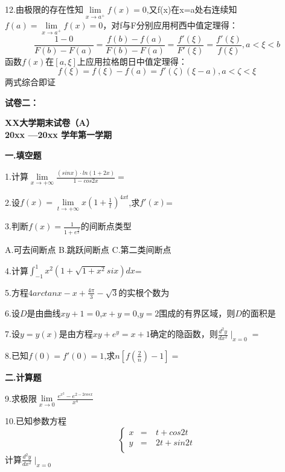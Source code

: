 \documentclass{ctexart}
\begin{document}
12.由极限的存在性知$\lim\limits_{x\rightarrow a^{+}}f(x)=0$,又f(x)在x=a处右连续知$f(a)=\lim\limits_{x\rightarrow a^{+}}f(x)=0$，对f与F分别应用柯西中值定理得：
$$\frac{1-0}{F(b)-F(a)}=\frac{f(b)-f(a)}{F(b)-F(a)}=\frac{f'(\xi)}{F'(\xi)}=\frac{f'(\xi)}{f(\xi)},a<\xi<b$$
函数$f(x)$在$[a,\xi]$上应用拉格朗日中值定理得：
$$f(\xi)=f(\xi)-f(a)=f'(\zeta)(\xi-a),a<\zeta<\xi$$
两式综合即证

\textbf{试卷二：}
\begin{center}
\textbf{XX大学期末试卷（A）\\
20xx —20xx	学年第一学期\\}
\end{center}
\textbf{一.填空题}

1.计算$\lim\limits_{x\rightarrow +\infty}\frac{(sinx)\cdot ln(1+2x)}{1-cos2x}=$\underline{\hspace{3em}}

2.设$f(x)=\lim\limits_{t\rightarrow +\infty}x(1+\frac{1}{t})^{4xt}$,求$f'(x)$=\underline{\hspace{3em}}

3.判断$f(x)=\frac{1}{1+e^{\frac{1}{x}}}$的间断点类型\underline{\hspace{3em}}

A.可去间断点  \qquad  B.跳跃间断点  \qquad  C.第二类间断点

4.计算$\int_{-1}^{1}x^{2}(1+\sqrt{1+x^{2}}six)dx$=\underline{\hspace{3em}}

5.方程$4arctanx-x+\frac{4\pi}{3}-\sqrt{3}$的实根个数为\underline{\hspace{3em}}

6.设$D$是由曲线$xy+1=0$,$x+y=0$,$y=2$围成的有界区域，则$D$的面积是\underline{\hspace{3em}}

7.设$y=y(x)$是由方程$xy+e^{y}=x+1$确定的隐函数，则$\frac{d^{2}y}{dx^{2}}\mid_{x=0}=$\underline{\hspace{3em}}

8.已知$f(0)=f'(0)=1$,求$n[f(\frac{2}{n})-1]=$\underline{\hspace{3em}}

\textbf{二.计算题}

9.求极限$\lim\limits_{x\rightarrow 0}\frac{e^{x^{2}}-e^{2-2cosx}}{x^{4}}$

10.已知参数方程$$\left\{
\begin{aligned}
x&=&\ t+cos2t\\
y&=&\ 2t+sin2t\\
\end{aligned}
\right.
$$
计算$\frac{d^{2}y}{dx^{2}}\mid_{x=0}$
\end{document}

